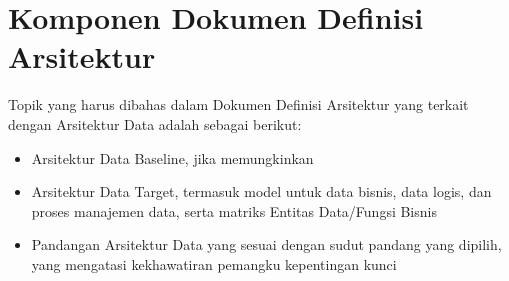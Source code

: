 \section{Komponen Dokumen Definisi Arsitektur}
\label{sec:data_komponen_dokumen_definisi_arsitektur}
Topik yang harus dibahas dalam Dokumen Definisi Arsitektur yang terkait dengan Arsitektur Data adalah sebagai berikut:
\begin{itemize}
	\item Arsitektur Data Baseline, jika memungkinkan
	\item Arsitektur Data Target, termasuk model untuk data bisnis, data logis, dan proses manajemen data, serta matriks Entitas Data/Fungsi Bisnis
	\item Pandangan Arsitektur Data yang sesuai dengan sudut pandang yang dipilih, yang mengatasi kekhawatiran pemangku kepentingan kunci
\end{itemize}

